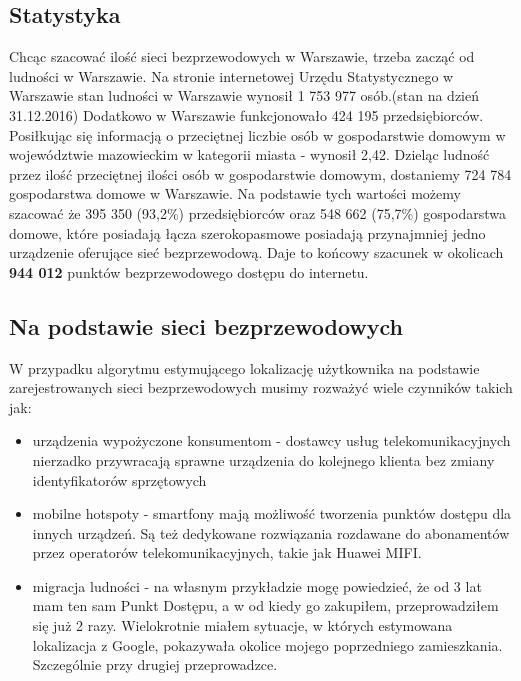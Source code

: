 \subsection{Statystyka}
Chcąc szacować ilość sieci bezprzewodowych w Warszawie, trzeba zacząć od ludności w Warszawie. Na stronie internetowej Urzędu Statystycznego w Warszawie stan ludności w Warszawie wynosił 1 753 977 osób.(stan na dzień 31.12.2016) Dodatkowo w Warszawie funkcjonowało 424 195 przedsiębiorców. Posiłkując się informacją o przeciętnej liczbie osób w gospodarstwie domowym w województwie mazowieckim w kategorii miasta - wynosił 2,42.\cite{PrognozaGospodarstwGUS} Dzieląc ludność przez ilość przeciętnej ilości osób w gospodarstwie domowym, dostaniemy 724 784 gospodarstwa domowe w Warszawie. Na podstawie tych wartości możemy szacować że 395 350 (93,2\%)\cite{SpoleczenstoInformacyjneGUS} przedsiębiorców oraz 548 662 (75,7\%) gospodarstwa domowe, które posiadają łącza szerokopasmowe posiadają przynajmniej jedno urządzenie oferujące sieć bezprzewodową. Daje to końcowy szacunek w okolicach \textbf{944 012} punktów bezprzewodowego dostępu do internetu.

\subsection{Na podstawie sieci bezprzewodowych}
W przypadku algorytmu estymującego lokalizację użytkownika na podstawie zarejestrowanych sieci bezprzewodowych musimy rozważyć wiele czynników takich jak:

\begin{itemize}
    \item urządzenia wypożyczone konsumentom - dostawcy usług telekomunikacyjnych nierzadko przywracają sprawne urządzenia do kolejnego klienta bez zmiany identyfikatorów sprzętowych
    \item mobilne hotspoty - smartfony mają możliwość tworzenia punktów dostępu dla innych urządzeń. Są też dedykowane rozwiązania rozdawane do abonamentów przez operatorów telekomunikacyjnych, takie jak Huawei MIFI.
    \item migracja ludności - na własnym przykładzie mogę powiedzieć, że od 3 lat mam ten sam Punkt Dostępu, a w od kiedy go zakupiłem, przeprowadziłem się już 2 razy. Wielokrotnie miałem sytuacje, w których estymowana lokalizacja z Google, pokazywała okolice mojego poprzedniego zamieszkania. Szczególnie przy drugiej przeprowadzce.
\end{itemize}

